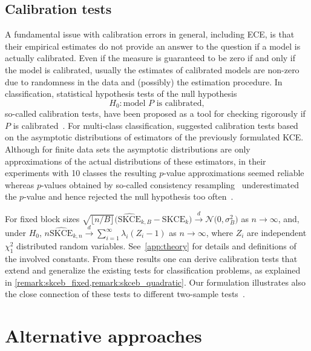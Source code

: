 \documentclass{article}
\begin{document}
\subsection{Calibration tests}

A fundamental issue with calibration errors in general, including ECE,
is that their empirical estimates do not provide an answer to the
question if a model is actually calibrated. Even if the measure is
guaranteed to be zero if and only if the model is calibrated,
usually the estimates of calibrated models are non-zero due to
randomness in the data and (possibly) the estimation procedure.
In classification, statistical hypothesis tests of the null hypothesis
\begin{equation*}
    H_0 \colon \text{model } P \text{ is calibrated},
\end{equation*}
so-called calibration tests, have been proposed as a tool for checking
rigorously if $P$ is calibrated~\citep{Broecker2007,Vaicenavicius2019,Widmann2019}.
For multi-class classification, \citet{Widmann2019} suggested 
calibration tests based on the asymptotic distributions of estimators
of the previously formulated KCE. Although for finite data sets the
asymptotic distributions are only approximations of the actual
distributions of these estimators, in their experiments with 10
classes the resulting $p$-value approximations seemed reliable whereas
$p$-values obtained by so-called consistency
resampling~\citep{Broecker2007,Vaicenavicius2019} underestimated
the $p$-value and hence rejected the null hypothesis too
often~\citep{Widmann2019}.



For fixed block sizes
$    \sqrt{\lfloor n / B \rfloor} \big(\widehat{\mathrm{SKCE}}_{k,B} - \mathrm{SKCE}_k\big) \xrightarrow{d} \mathcal{N}\big(0, \sigma^2_B\big)$ as $n \to \infty$,
and, under $H_0$,
$n \widehat{\mathrm{SKCE}}_{k,n} \xrightarrow{d} \sum_{i=1}^\infty \lambda_i (Z_i - 1)$ as $n \to \infty$,
where $Z_i$ are independent $\chi_1^2$ distributed random variables. See~\cref{app:theory} for details and definitions of the involved constants.
From these results one can derive
calibration tests that extend and generalize the existing tests
for classification problems, as explained in
\cref{remark:skceb_fixed,remark:skceb_quadratic}.
Our formulation illustrates also the close connection of these tests
to different two-sample tests~\citep{Gretton2007,Zaremba2013}.

\section{Alternative approaches}
\end{document}
